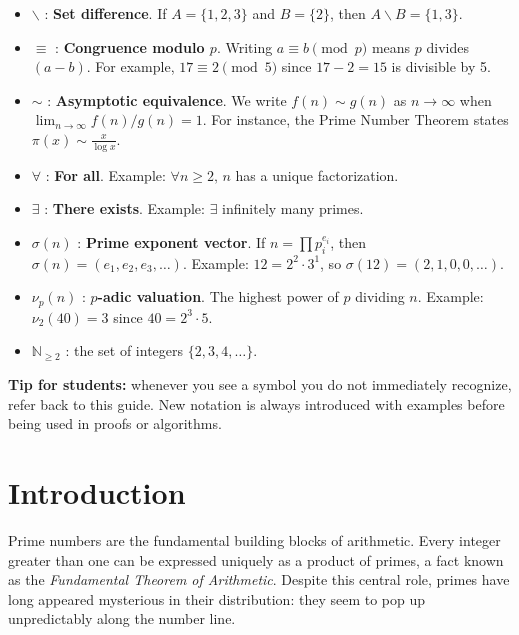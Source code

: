 \documentclass[11pt]{article}
\theoremstyle{definition}
\begin{document}
\begin{itemize}
  \item $\backslash$ : \textbf{Set difference}. 
  If $A = \{1,2,3\}$ and $B = \{2\}$, then $A \backslash B = \{1,3\}$.

  \item $\equiv$ : \textbf{Congruence modulo $p$}. 
  Writing $a \equiv b \pmod{p}$ means $p$ divides $(a-b)$. 
  For example, $17 \equiv 2 \pmod{5}$ since $17-2=15$ is divisible by 5.

  \item $\sim$ : \textbf{Asymptotic equivalence}. 
  We write $f(n) \sim g(n)$ as $n \to \infty$ when $\lim_{n \to \infty} f(n)/g(n) = 1$. 
  For instance, the Prime Number Theorem states $\pi(x) \sim \tfrac{x}{\log x}$.

  \item $\forall$ : \textbf{For all}. Example: $\forall n \geq 2, \, n$ has a unique factorization.

  \item $\exists$ : \textbf{There exists}. Example: $\exists$ infinitely many primes.

  \item $\sigma(n)$ : \textbf{Prime exponent vector}. 
  If $n = \prod p_i^{e_i}$, then $\sigma(n) = (e_1,e_2,e_3,\dots)$. 
  Example: $12 = 2^2 \cdot 3^1$, so $\sigma(12) = (2,1,0,0,\dots)$.

  \item $\nu_p(n)$ : \textbf{$p$-adic valuation}. 
  The highest power of $p$ dividing $n$. 
  Example: $\nu_2(40) = 3$ since $40 = 2^3 \cdot 5$.

  \item $\mathbb{N}_{\geq 2}$ : the set of integers $\{2,3,4,\dots\}$.
\end{itemize}

\vspace{1em}
\noindent
\textbf{Tip for students:} whenever you see a symbol you do not immediately recognize, 
refer back to this guide. New notation is always introduced with examples before being 
used in proofs or algorithms.

\section{Introduction}

Prime numbers are the fundamental building blocks of arithmetic. 
Every integer greater than one can be expressed uniquely as a product of primes, 
a fact known as the \emph{Fundamental Theorem of Arithmetic}. 
Despite this central role, primes have long appeared mysterious in their distribution: 
they seem to pop up unpredictably along the number line. 
\end{document}
